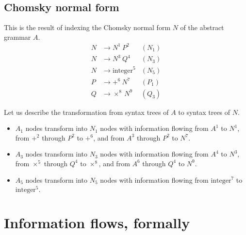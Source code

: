\documentclass{amsart}
\gdef\R{\rightarrow}
\begin{document}
\subsection{Chomsky normal form}

This is the result of indexing the Chomsky normal form $N$ of the
abstract grammar $A$.
\begin{align*}
N &\R N^1~P^2 & (N_1) \\
N &\R N^3~Q^4 & (N_3) \\
N &\R \mbox{integer}^5 & (N_5) \\
P &\R +^6~N^7 & (P_1) \\
Q &\R \times^8~N^9 & (Q_3)
\end{align*}

Let us describe the transformation from syntax trees of $A$ to
syntax trees of $N$.
\begin{itemize}
\item $A_1$ nodes transform into $N_1$ nodes with information
flowing from $A^1$ to $N^1$, from $+^2$ through $P^2$ to $+^6$,
and from $A^3$ through $P^2$ to $N^7$.
\item $A_3$ nodes transform into $N_3$ nodes with information
flowing from $A^4$ to $N^3$, from $\times^5$ through $Q^4$ to
$\times^8$, and from $A^6$ through $Q^4$ to $N^9$.
\item $A_5$ nodes transform into $N_5$ nodes with information
flowing from $\mbox{integer}^7$ to $\mbox{integer}^5$.
\end{itemize}

\section{Information flows, formally}
\end{document}
